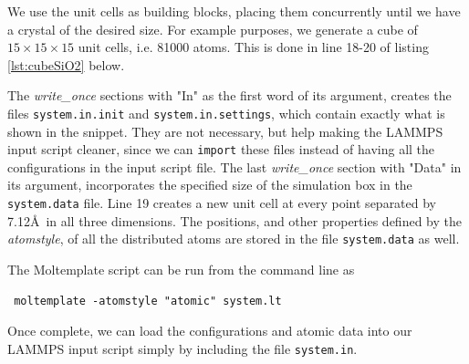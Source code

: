 \documentclass[twoside,english]{uiofysmaster}
\begin{document}

We use the unit cells as building blocks, placing them concurrently until we have a crystal of the desired size. For example purposes, we generate a cube of $15\times15\times15$ unit cells, i.e. 81000 atoms. This is done in line 18-20 of listing \ref{lst:cubeSiO2} below.

The \textit{write\_once} sections with "In" as the first word of its argument, creates the files \texttt{system.in.init} and \texttt{system.in.settings}, which contain exactly what is shown in the snippet. 
They are not necessary, but help making the LAMMPS input script cleaner, since we can \texttt{import} these files instead of having all the configurations in the input script file.
The last \textit{write\_once} section with "Data" in its argument, incorporates the specified size of the simulation box in the \texttt{system.data} file. 
Line 19 creates a new unit cell at every point separated by 7.12\AA ~in all three dimensions. The positions, and other properties defined by the \textit{atomstyle}, of all the distributed atoms are stored in the file \texttt{system.data} as well. 

The Moltemplate script can be run from the command line as
 \begin{lstlisting}
 moltemplate -atomstyle "atomic" system.lt
 \end{lstlisting}
Once complete, we can load the configurations and atomic data into our LAMMPS input script simply by including the file \texttt{system.in}.
\end{document}
